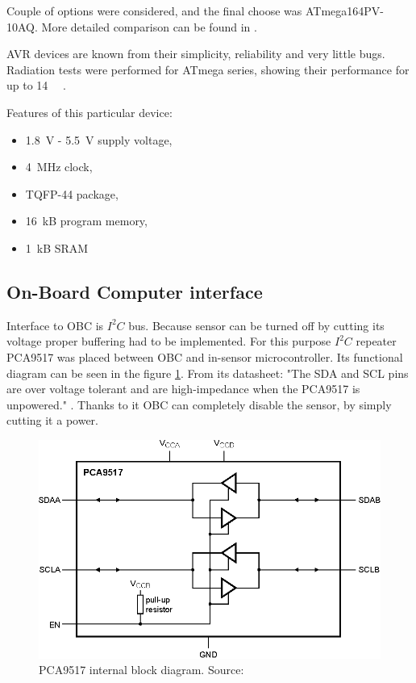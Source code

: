         Couple of options were considered, and the final choose was ATmega164PV-10AQ. More detailed comparison can be found in \cite{PWSAT_EPS_CDR}.

        AVR devices are known from their simplicity, reliability and very little bugs. Radiation tests were performed for ATmega series, showing their performance for up to \SI{14}{\kilo\rad} \cite{ATMEGA128_radiation_tests}.

        Features of this particular device:
        \begin{itemize}
            \item \SI{1.8}{\volt} - \SI{5.5}{\volt} supply voltage,
            \item \SI{4}{\mega\hertz} clock,
            \item TQFP-44 package,
            \item \SI{16}{\kilo B} program memory,
            \item \SI{1}{\kilo B} SRAM
        \end{itemize}

    \subsection{On-Board Computer interface}
        Interface to OBC is $I^2C$ bus. Because sensor can be turned off by cutting its voltage proper buffering had to be implemented. For this purpose $I^2C$ repeater PCA9517 was placed between OBC and in-sensor microcontroller. Its functional diagram can be seen in the figure \ref{PCA9517}. From its datasheet: "The SDA and SCL pins are over voltage tolerant and are high-impedance when the PCA9517 is unpowered." \cite{PCA9517_datasheet}. Thanks to it OBC can completely disable the sensor, by simply cutting it a power.

        \begin{figure}[H]
            \centering
            \includegraphics[width=0.7\paperwidth]{img/06/PCA9517.eps}
            \caption{PCA9517 internal block diagram. Source: \cite{PCA9517_datasheet}}
            \label{PCA9517}
        \end{figure}


